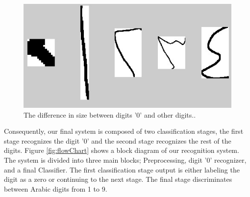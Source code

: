 \documentclass[10pt]{IEEEtran}
\begin{document}
 \begin{figure}
	\centering
		\includegraphics[scale=0.2]{Zero1}
	\caption[Arabic '0' Digits Versus Other digits] {The difference in size between digits '0' and other digits..}
	\label{fig:zeroVersusOther}
\end{figure}

 Consequently,  our final system is composed of two classification stages, the first stage recognizes the digit '0' and the second stage recognizes the rest of the digits. Figure \ref{fig:flowChart} shows a block diagram of our recognition system. The system is divided into three main blocks; Preprocessing, digit '0' recognizer, and a final Classifier. The first classification stage output is either labeling the digit as a zero or continuing to the next stage. The final stage discriminates between Arabic digits from 1 to 9.
\end{document}
